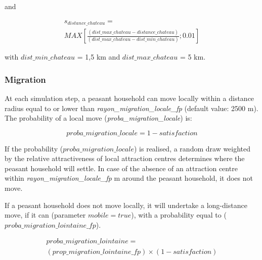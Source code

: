 \documentclass[a4paper,11pt]{article}
\begin{document}
{\begin{sloppypar}
\begin{enumerate}
and

\begin{small}
\begin{equation}
\begin{gathered}
s_{distance\_chateau} =\\ MAX \left \lbrack \frac{(dist\_max\_chateau - distance\_chateau)}{(dist\_max\_chateau - dist\_min\_chateau)}; 0.01 \right \rbrack
\end{gathered}
\end{equation}

with $dist\_min\_chateau$ = 1,5 km and $dist\_max\_chateau$ = 5 km.

\end{small}
\end{enumerate}
\end{sloppypar}


\subsubsection{Migration}
\begin{sloppypar}
At each simulation step, a peasant household can move locally within a distance radius equal to or lower than \textit{rayon\_migration\_locale\_fp} (default value: 2500 m). The probability of a local move (\textit{proba\_migration\_locale}) is:

\begin{small}
\begin{equation}
proba\_migration\_locale = 1 - satisfaction
\end{equation}
\end{small}

If the probability ($proba\_migration\_locale$) is realised, a random draw weighted by the relative attractiveness of local attraction centres determines where the peasant household will settle. In case of the absence of an attraction centre within \textit{rayon\_migration\_locale\_fp} m around the peasant household, it does not move.

If a peasant household does not move locally, it will undertake a long-distance move, if it can (parameter $ mobile = true $), with a probability equal to ($proba\_migration\_lointaine\_fp$).

\begin{small}
\begin{equation}
\begin{gathered}
proba\_migration\_lointaine =  \\
(prop\_migration\_lointaine\_fp) \times (1 - satisfaction)
\end{gathered}
\end{equation}
\end{small}


\end{sloppypar}}
\end{document}
